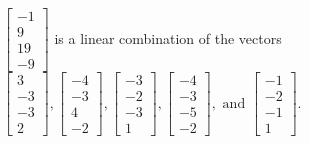 \begin{exercise}
\begin{exerciseStatement}
  \end{exerciseStatement}
  \begin{exerciseAnswer}
   \(\left[\begin{array}{c}
-1 \\
9 \\
19 \\
-9
\end{array}\right]\) 
  	 is  
	a linear combination of the vectors \(\left[\begin{array}{c}
3 \\
-3 \\
-3 \\
2
\end{array}\right] , \left[\begin{array}{c}
-4 \\
-3 \\
4 \\
-2
\end{array}\right] , \left[\begin{array}{c}
-3 \\
-2 \\
-3 \\
1
\end{array}\right] , \left[\begin{array}{c}
-4 \\
-3 \\
-5 \\
-2
\end{array}\right] , \text{ and } \left[\begin{array}{c}
-1 \\
-2 \\
-1 \\
1
\end{array}\right]\).

	
  


  \end{exerciseAnswer}
\end{exercise}